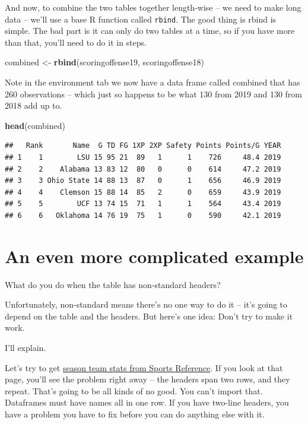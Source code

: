 \documentclass[
]{book}
\newenvironment{Shaded}{\begin{snugshade}}{\end{snugshade}}
\newcommand{\KeywordTok}[1]{\textcolor[rgb]{0.13,0.29,0.53}{\textbf{#1}}}
\newcommand{\NormalTok}[1]{#1}
\newcommand{\StringTok}[1]{\textcolor[rgb]{0.31,0.60,0.02}{#1}}
\begin{document}
And now, to combine the two tables together length-wise -- we need to make long data -- we'll use a base R function called \texttt{rbind}. The good thing is rbind is simple. The bad part is it can only do two tables at a time, so if you have more than that, you'll need to do it in steps.

\begin{Shaded}
\begin{Highlighting}[]
\NormalTok{combined <-}\StringTok{ }\KeywordTok{rbind}\NormalTok{(scoringoffense19, scoringoffense18)}
\end{Highlighting}
\end{Shaded}

Note in the environment tab we now have a data frame called combined that has 260 observations -- which just so happens to be what 130 from 2019 and 130 from 2018 add up to.

\begin{Shaded}
\begin{Highlighting}[]
\KeywordTok{head}\NormalTok{(combined)}
\end{Highlighting}
\end{Shaded}

\begin{verbatim}
##   Rank       Name  G TD FG 1XP 2XP Safety Points Points/G YEAR
## 1    1        LSU 15 95 21  89   1      1    726     48.4 2019
## 2    2    Alabama 13 83 12  80   0      0    614     47.2 2019
## 3    3 Ohio State 14 88 13  87   0      1    656     46.9 2019
## 4    4    Clemson 15 88 14  85   2      0    659     43.9 2019
## 5    5        UCF 13 74 15  71   1      1    564     43.4 2019
## 6    6   Oklahoma 14 76 19  75   1      0    590     42.1 2019
\end{verbatim}

\hypertarget{an-even-more-complicated-example}{%
\section{An even more complicated example}\label{an-even-more-complicated-example}}

What do you do when the table has non-standard headers?

Unfortunately, non-standard means there's no one way to do it -- it's going to depend on the table and the headers. But here's one idea: Don't try to make it work.

I'll explain.

Let's try to get \href{https://www.sports-reference.com/cbb/seasons/2019-school-stats.html}{season team stats from Sports Reference}. If you look at that page, you'll see the problem right away -- the headers span two rows, and they repeat. That's going to be all kinds of no good. You can't import that. Dataframes must have names all in one row. If you have two-line headers, you have a problem you have to fix before you can do anything else with it.
\end{document}
